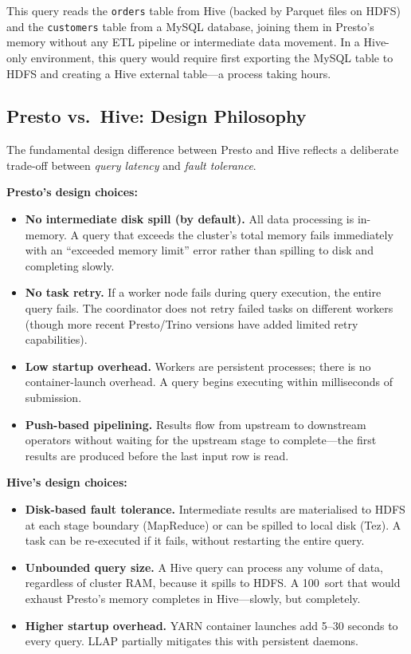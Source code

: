 This query reads the \texttt{orders} table from Hive (backed by Parquet
files on HDFS) and the \texttt{customers} table from a MySQL database,
joining them in Presto's memory without any ETL pipeline or intermediate
data movement. In a Hive-only environment, this query would require first
exporting the MySQL table to HDFS and creating a Hive external table---a
process taking hours.

\subsection{Presto vs.\ Hive: Design Philosophy}
\label{subsec:presto-vs-hive}

The fundamental design difference between Presto and Hive reflects a
deliberate trade-off between \emph{query latency} and \emph{fault tolerance}.

\textbf{Presto's design choices:}
\begin{itemize}
  \item \textbf{No intermediate disk spill (by default).} All data
        processing is in-memory. A query that exceeds the cluster's
        total memory fails immediately with an ``exceeded memory limit''
        error rather than spilling to disk and completing slowly.
  \item \textbf{No task retry.} If a worker node fails during query
        execution, the entire query fails. The coordinator does not
        retry failed tasks on different workers (though more recent
        Presto/Trino versions have added limited retry capabilities).
  \item \textbf{Low startup overhead.} Workers are persistent processes;
        there is no container-launch overhead. A query begins executing
        within milliseconds of submission.
  \item \textbf{Push-based pipelining.} Results flow from upstream to
        downstream operators without waiting for the upstream stage to
        complete---the first results are produced before the last input
        row is read.
\end{itemize}

\textbf{Hive's design choices:}
\begin{itemize}
  \item \textbf{Disk-based fault tolerance.} Intermediate results are
        materialised to HDFS at each stage boundary (MapReduce) or
        can be spilled to local disk (Tez). A task can be re-executed
        if it fails, without restarting the entire query.
  \item \textbf{Unbounded query size.} A Hive query can process any
        volume of data, regardless of cluster RAM, because it spills
        to HDFS. A 100\TB\ sort that would exhaust Presto's memory
        completes in Hive---slowly, but completely.
  \item \textbf{Higher startup overhead.} YARN container launches add
        5--30 seconds to every query. LLAP partially mitigates this
        with persistent daemons.
\end{itemize}

